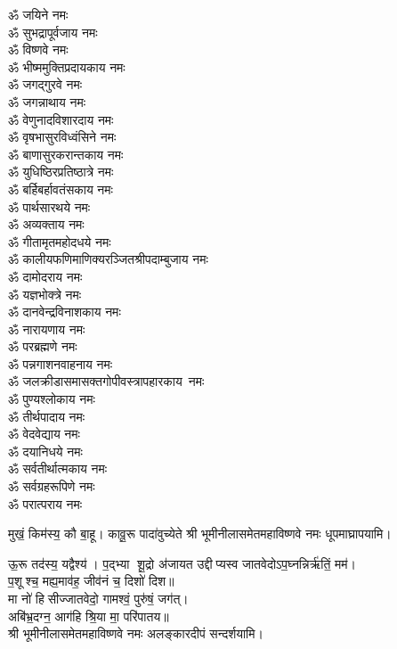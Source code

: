 \begin{center}
\begin{multicols}{2}
\begin{flushleft}
ॐ जयिने नमः\hfill{}\\
ॐ सुभद्रापूर्वजाय नमः\\
ॐ विष्णवे नमः\\
ॐ भीष्ममुक्तिप्रदायकाय नमः\\
ॐ जगद्गुरवे नमः\\
ॐ जगन्नाथाय नमः\\
ॐ वेणुनादविशारदाय नमः\\
ॐ वृषभासुरविध्वंसिने नमः\\
ॐ बाणासुरकरान्तकाय नमः\\
ॐ युधिष्ठिरप्रतिष्ठात्रे नमः\\
ॐ बर्हिबर्हावतंसकाय नमः\hfill{}\\
ॐ पार्थसारथये नमः\\
ॐ अव्यक्ताय नमः\\
ॐ गीतामृतमहोदधये नमः\\
ॐ कालीयफणिमाणिक्य\-रञ्जित\-श्री\-पदाम्बुजाय नमः\\
ॐ दामोदराय नमः\\
ॐ यज्ञभोक्त्रे नमः\\
ॐ दानवेन्द्रविनाशकाय नमः\\
ॐ नारायणाय नमः\\
ॐ परब्रह्मणे नमः\\
ॐ पन्नगाशनवाहनाय नमः\hfill{}\\
ॐ जलक्रीडासमासक्त\-गोपी\-वस्त्रापहारकाय~नमः\\
ॐ पुण्यश्लोकाय नमः\\
ॐ तीर्थपादाय नमः\\
ॐ वेदवेद्याय नमः\\
ॐ दयानिधये नमः\\
ॐ सर्वतीर्थात्मकाय नमः\\
ॐ सर्वग्रहरूपिणे नमः\\
ॐ परात्पराय नमः\hfill{}\\
\end{flushleft}
\end{multicols}

  

{मुखं॒ किम॑स्य॒ कौ बा॒हू। कावू॒रू पादा॑वुच्येते}
श्री भूमीनीलासमेतमहाविष्णवे नमः धूपमाघ्रापयामि।\medskip
 
{ऊ॒रू तद॑स्य॒ यद्वैश्य॑। प॒द्भ्या शू॒द्रो अ॑जायत}
उद्दीप्यस्व जातवेदोऽप॒घ्नन्निर्ऋ॑तिं॒ मम॑।\\
 प॒शूश्च॒ मह्य॒माव॑ह॒ जीव॑नं च॒ दिशो॑ दिश॥ \\
मा नो॑ हिसीज्जातवेदो॒ गामश्वं॒ पुरु॑षं॒ जग॑त्।\\
अबि॑भ्र॒दग्न॒ आग॑हि श्रि॒या मा॒ परि॑पातय॥ \\
श्री भूमीनीलासमेतमहाविष्णवे नमः अलङ्कारदीपं सन्दर्शयामि।\medskip


\end{center}
